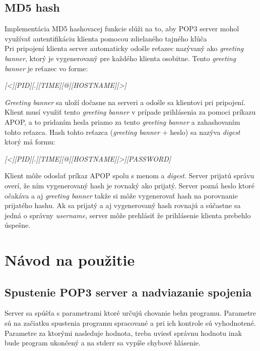 \documentclass[11pt,a4paper]{article}
\begin{document}
	\subsection{MD5 hash}
		\indent Implementácia MD5 hashovacej funkcie slúži na to, aby POP3 server mohol využívať autentifikáciu klienta pomocou zdielaného tajného kľúča\\[0.4em]
		\indent Pri pripojení klienta server automaticky odošle reťazec nazývaný ako \textit{greeting banner}, ktorý je vygenerovaný pre každého klienta osobitne. Tento \textit{greeting banner} je reťazec vo forme:
		\begin{center}
		\textit{[<][PID][.][TIME][@][HOSTNAME][>]}\\[0.4em]
		\end{center}
		\textit{Greeting banner} sa uloží dočasne na serveri a odošle sa klientovi pri pripojení. Klient musí využiť tento \textit{greeting banner} v prípade prihlásenia za pomoci príkazu APOP, a to pridaním hesla priamo za tento \textit{greeting banner} a zahashovaním tohto reťazca. Hash tohto reťazca (\textit{greeting banner} + heslo) sa nazýva \textit{digest} ktorý má formu:
		\begin{center}
		\textit{[<][PID][.][TIME][@][HOSTNAME][>][PASSWORD]}
		\end{center}
		Klient môže odoslať príkaz APOP spolu s menom a \textit{digest}. Server prijatú správu overí, že ním vygenerovaný hash je rovnaký ako prijatý. Server pozná heslo ktoré očakáva a aj \textit{greeting banner} takže si môže vygenerovať hash na porovnanie prijatého hashu. Ak sa prijatý a aj vygenerovaný hash rovnajú a súčastne sa jedná o správny \textit{username}, server môže prehlásiť že prihlásenie klienta prebehlo úspešne.

\section{Návod na použitie}

	\subsection{Spustenie POP3 server a nadviazanie spojenia}

	Server sa spúšťa s parametrami ktoré určujú chovanie behu programu. Parametre sú na začiatku spustenia programu spracované a pri ich kontrole sú vyhodnotené. Parametre za ktorými nasleduje hodnota, treba uviesť správnu hodnotu inak bude program ukončený a na stderr sa vypíše chybové hlásenie.\\
\end{document}
